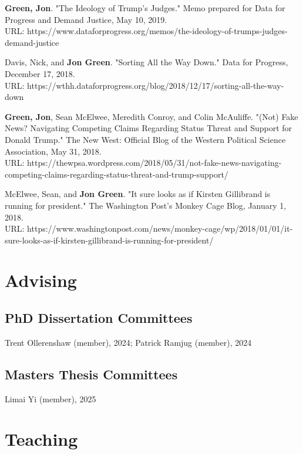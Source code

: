 \documentclass[letterpaper]{article}
\renewenvironment{itemize}{
  \begin{list}{}{
    \setlength{\leftmargin}{1.5em}
  }
}{
  \end{list}
}
\begin{document}
\begin{itemize}
\item \textbf{Green, Jon}. "The Ideology of Trump's Judges." Memo prepared for Data for Progress and Demand Justice, May 10, 2019. \\
URL: https://www.dataforprogress.org/memos/the-ideology-of-trumps-judges-demand-justice

\item Davis, Nick, and \textbf{Jon Green}. "Sorting All the Way Down." Data for Progress, December 17, 2018. \\
URL: https://wthh.dataforprogress.org/blog/2018/12/17/sorting-all-the-way-down

\item \textbf{Green, Jon}, Sean McElwee, Meredith Conroy, and Colin McAuliffe. "(Not) Fake News? Navigating Competing Claims Regarding Status Threat and Support for Donald Trump." The New West: Official Blog of the Western Political Science Association, May 31, 2018. \\
URL: https://thewpsa.wordpress.com/2018/05/31/not-fake-news-navigating-competing-claims-regarding-status-threat-and-trump-support/

\item McElwee, Sean, and \textbf{Jon Green}. "It sure looks as if Kirsten Gillibrand is running for president." The Washington Post's Monkey Cage Blog, January 1, 2018. \\ 
URL: https://www.washingtonpost.com/news/monkey-cage/wp/2018/01/01/it-sure-looks-as-if-kirsten-gillibrand-is-running-for-president/
\end{itemize}

\section*{Advising}

\subsection*{PhD Dissertation Committees}

Trent Ollerenshaw (member), 2024; Patrick Ramjug (member), 2024

\subsection*{Masters Thesis Committees}

Limai Yi (member), 2025

\section*{Teaching}
\end{document}
